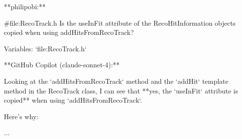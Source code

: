 \raggedright
\begin{markdown}
**philipobi:**  

#file:RecoTrack.h  Is the useInFit attribute of the RecoHitInformation objects copied when using addHitsFromRecoTrack?

Variables: `file:RecoTrack.h`
\end{markdown}
\tcblower
\raggedright
\begin{markdown}
**GitHub Copilot (claude-sonnet-4):**  

Looking at the `addHitsFromRecoTrack` method and the `addHit` template method in the RecoTrack class, I can see that **yes, the `useInFit` attribute is copied** when using `addHitsFromRecoTrack`.  

Here's why:  

...
\end{markdown}